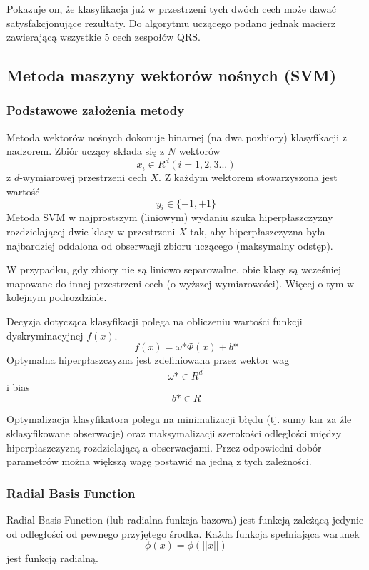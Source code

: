 \documentclass[[10pt,a4paper]{article}
\begin{document}
Pokazuje on, że klasyfikacja już w przestrzeni tych dwóch cech może dawać satysfakcjonujące rezultaty. Do algorytmu uczącego podano jednak macierz zawierającą wszystkie 5 cech zespołów QRS.
\subsection{Metoda maszyny wektorów nośnych (SVM)}
\subsubsection{Podstawowe założenia metody}
Metoda wektorów nośnych dokonuje binarnej (na dwa pozbiory) klasyfikacji z nadzorem. Zbiór uczący składa się z $N$ wektorów
\begin{equation}
x_i \in R^d (i = 1, 2, 3...)
\end{equation}
z $d$-wymiarowej przestrzeni cech $X$. Z każdym wektorem stowarzyszona jest wartość
\begin{equation}
y_i \in \{-1, +1\}
\end{equation}
Metoda SVM w najprostszym (liniowym) wydaniu szuka hiperpłaszczyzny rozdzielającej dwie klasy w przestrzeni $X$ tak, aby hiperpłaszczyzna była najbardziej oddalona od obserwacji zbioru uczącego (maksymalny odstęp).

W przypadku, gdy zbiory nie są liniowo separowalne, obie klasy są wcześniej mapowane do innej przestrzeni cech (o wyższej wymiarowości). Więcej o tym w kolejnym podrozdziale.

Decyzja dotycząca klasyfikacji polega na obliczeniu wartości funkcji dyskryminacyjnej $f(x)$.
\begin{equation}
f(x) = \omega\text{*} \Phi(x) + b\text{*}
\end{equation}
Optymalna hiperpłaszczyzna jest zdefiniowana przez wektor wag
\begin{equation}
\omega\text{*} \in R^{d^\prime}
\end{equation}
i bias
\begin{equation}
b\text{*} \in R
\end{equation}

Optymalizacja klasyfikatora polega na minimalizacji błędu (tj. sumy kar za źle sklasyfikowane obserwacje) oraz maksymalizacji szerokości odległości między hiperpłaszczyzną rozdzielającą a obserwacjami. Przez odpowiedni dobór parametrów można większą wagę postawić na jedną z tych zależności.
\subsubsection{Radial Basis Function}
Radial Basis Function (lub radialna funkcja bazowa) jest funkcją zależącą jedynie od odległości od pewnego przyjętego środka. Każda funkcja spełniająca warunek
\begin{equation}
\phi(x) = \phi(||x||)
\end{equation}
jest funkcją radialną.
\end{document}
